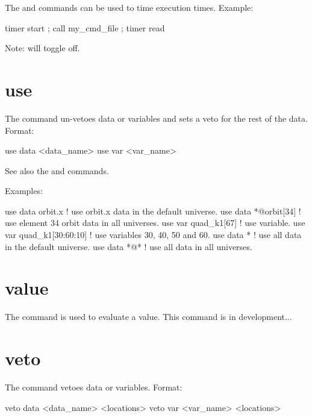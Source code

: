 {{{{{{The  and  commands can be used to time execution
times. Example:
\begin{example}
  timer start ; call my_cmd_file ; timer read
\end{example}

Note:  will toggle  off.

\section{use}
\label{s:use}

The  command un-vetoes data or variables and sets a veto for the rest of the
data. Format:
\begin{example}
  use data  <data_name>
  use var <var_name>
\end{example}

\vskip 7pt 

See also the  and  commands.

Examples:
\begin{example}
  use data orbit.x             ! use orbit.x data in the default universe.
  use data *@orbit[34]         ! use element 34 orbit data in all universes.
  use var quad_k1[67]          ! use variable.
  use var quad_k1[30:60:10]    ! use variables 30, 40, 50 and 60.
  use data *                   ! use all data in the default universe.
  use data *@*                 ! use all data in all universes.
\end{example}

\section{value}
\label{s:value}

The  command is used to evaluate a value.  This command is in development...

\section{veto}
\label{s:veto}

The  command vetoes data or variables. Format:
\begin{example}
  veto data <data_name> <locations>
  veto var <var_name> <locations>
\end{example}

}}}}}}
